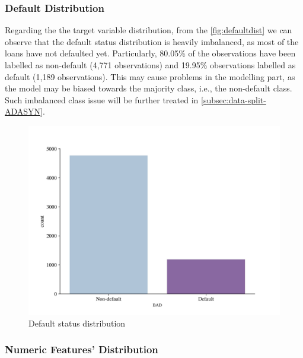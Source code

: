 \subsubsection{Default Distribution}

Regarding the the target variable distribution, from the \autoref{fig:defaultdist} we can observe that the default status distribution is heavily imbalanced, as most of the loans have not defaulted yet.
Particularly, 80.05\% of the observations have been labelled as non-default (4,771 observations) and 19.95\% observations labelled as default (1,189 observations).
This may cause problems in the modelling part, as the model may be biased towards the majority class, i.e., the non-default class. Such imbalanced class issue will be further treated in \autoref{subsec:data-split-ADASYN}.

\begin{figure}[H]
    \centering
    \caption{Default status distribution}
    \label{fig:defaultdist}
    \includegraphics[width=150mm]{Figures/Default_Distribution.jpg}\vspace{-1em}
\vspace{-1em}
\end{figure}

\subsubsection{Numeric Features' Distribution}
\label{subsubsec:numdist}

